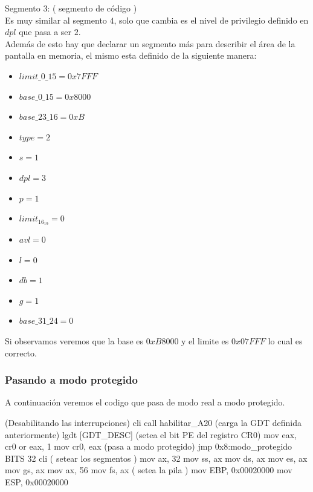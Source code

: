 \documentclass[a4paper,10pt,twoside]{article}
\newenvironment{pseudocodigo}
    {\vspace{0.5em} \begin{algorithmic}}
    {\end{algorithmic} \vspace{0.5em}}
\begin{document}
Segmento $3$: ( segmento de código ) \\
Es muy similar al segmento $4$, solo que cambia es el nivel de privilegio definido en $dpl$ que pasa a ser $2$. \\ 

Además de esto hay que declarar un segmento más para describir el área de la pantalla en memoria, el mismo esta definido de la siguiente manera: 
\begin{itemize}
 \item $limit\_0\_15 = 0x7FFF$
 \item $base\_0\_15 = 0x8000$ 
 \item $base\_23\_16 = 0xB$
 \item $type = 2$
 \item $s = 1$
 \item $dpl = 3$
 \item $p = 1$
 \item $limit_16_19 = 0$
 \item $avl = 0$
 \item $l = 0$
 \item $db = 1$
 \item $g = 1$
 \item $base\_31\_24  = 0$
\end{itemize}

Si observamos veremos que la base es $0xB8000$ y el limite es $0x07FFF$ lo cual es correcto.

\subsubsection{Pasando a modo protegido}

A continuación veremos el codigo que pasa de modo real a modo protegido.

\begin{pseudocodigo}
  \STATE
  \STATE (Desabilitando las interrupciones)
  \STATE cli
  \STATE
  \STATE call habilitar\_A20
  \STATE
  \STATE (carga la GDT definida anteriormente)
  \STATE lgdt [GDT\_DESC]
  \STATE
  \STATE (setea el bit PE del registro CR0)
  \STATE mov eax, cr0
  \STATE or eax, 1
  \STATE mov cr0, eax
  \STATE
  \STATE (pasa a modo protegido)
  \STATE jmp 0x8:modo\_protegido
  \STATE BITS 32
  \STATE cli
  \STATE 
  \STATE ( setear los segmentos )
  \STATE mov ax, 32
  \STATE mov ss, ax
  \STATE mov ds, ax
  \STATE mov es, ax
  \STATE mov gs, ax
  \STATE mov ax, 56
  \STATE mov fs, ax
  \STATE 
  \STATE ( setea la pila )
  \STATE mov EBP, 0x00020000	
  \STATE mov ESP, 0x00020000
\end{pseudocodigo}
\end{document}
